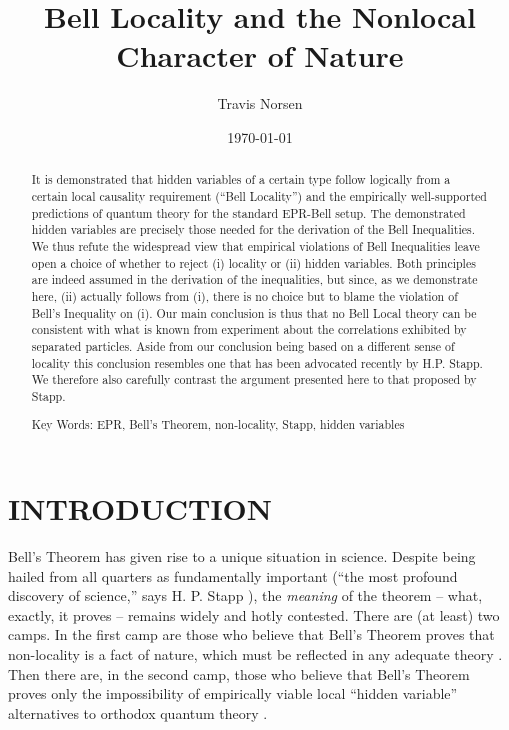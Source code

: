 \documentclass[aps,prc,onecolumn,12pt]{revtex4-2}
\begin{document}
\title{Bell Locality and the Nonlocal Character of Nature}
\author{Travis Norsen}

\date{\today}

\begin{abstract}
It is demonstrated that hidden variables of a certain type
follow logically from a certain local causality requirement (``Bell Locality'')
and the empirically well-supported predictions of
quantum theory for the standard EPR-Bell setup.
The demonstrated hidden variables are precisely
those needed for the derivation of the Bell Inequalities.  We
thus refute the widespread view that empirical violations of Bell
Inequalities leave open a choice of whether to reject (i) locality or
(ii) hidden variables.  Both principles are indeed assumed in the
derivation of the inequalities, but since, as we demonstrate here,
(ii) actually follows from (i), there is no choice but to blame the
violation of Bell's Inequality on (i).  Our main conclusion is thus
that no Bell Local theory can be consistent with what is known from
experiment about the correlations exhibited by separated particles.
Aside from our conclusion being based on a different sense of locality
this conclusion
resembles one that has been advocated recently by H.P. Stapp.
We therefore also carefully contrast
the argument presented here to that proposed by Stapp.

\bigskip

Key Words:  EPR, Bell's Theorem, non-locality, Stapp, hidden variables

\end{abstract}

\maketitle

\newpage

\section{INTRODUCTION}
\label{sec1}

Bell's Theorem \cite{bell} has given rise to a unique situation in
science.
Despite being hailed from all quarters as fundamentally important
(``the most profound discovery of science,'' says H. P. Stapp
\cite{stappquote}),
the \emph{meaning} of the theorem -- what, exactly, it proves -- remains
widely and hotly contested.  There are (at least) two camps.  In the
first camp are those who believe
that Bell's Theorem proves that non-locality is a fact of nature,
which must be reflected in any adequate theory
\cite{bell,maudlin,shelly,norsen,wiseman}.
Then there are, in the second camp,
those who believe that Bell's Theorem proves only the impossibility of
empirically viable local ``hidden variable'' alternatives to orthodox
quantum theory \cite{wigner,merminquote}.
\end{document}
